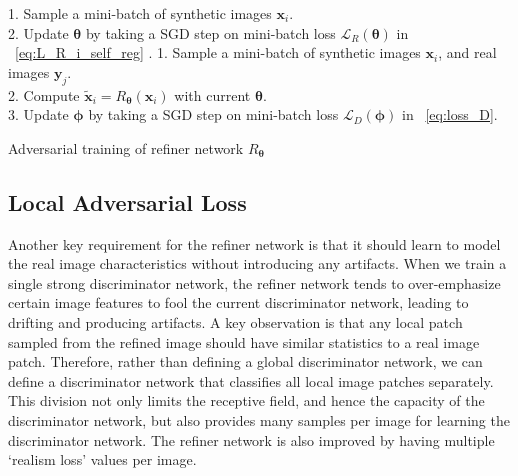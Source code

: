 \documentclass[10pt,twocolumn,letterpaper]{article}
\begin{document}
\begin{algorithm}[t]
{
{
1. Sample a mini-batch of  synthetic images $\mathbf x_i$. \\
2. Update $\boldsymbol \theta$ by taking a SGD step on mini-batch loss $ {\mathcal L}_R(\boldsymbol \theta)$ in ~\eqref{eq:L_R_i_self_reg} .
}
{
1. Sample a mini-batch of  synthetic images $ \mathbf x_i$, and real images $\mathbf y_j$. \\
2. Compute $\tilde{\mathbf x}_i = R_{\boldsymbol \theta}(\mathbf x_i)$ with current $\boldsymbol \theta$. \\
3. Update $\boldsymbol \phi$ by taking a SGD step  on mini-batch loss $  {\mathcal L}_D(\boldsymbol \phi)$ in ~\eqref{eq:loss_D}.
}

}
\caption{Adversarial training of refiner network $R_{\boldsymbol \theta}$}
\label{alg:training_GAN_w_L1}
\vspace{-0.2cm}
\end{algorithm}



\subsection{Local Adversarial Loss}
Another key requirement for the refiner network is that it should learn to model the real image characteristics without introducing any artifacts. When we train a single strong discriminator network, the refiner network tends to over-emphasize certain image features to fool the current discriminator network, leading to drifting and producing artifacts.
A key observation is that any local patch sampled from the refined image should have similar statistics to a real image patch. 
Therefore, rather than defining a global discriminator network, we can define a discriminator network that classifies all local image patches separately.
This division not only limits the receptive field, and hence the capacity of the discriminator network, but also provides many samples per image for learning the discriminator network. 
The refiner network is also improved by having multiple `realism loss' values per image. 
\end{document}
